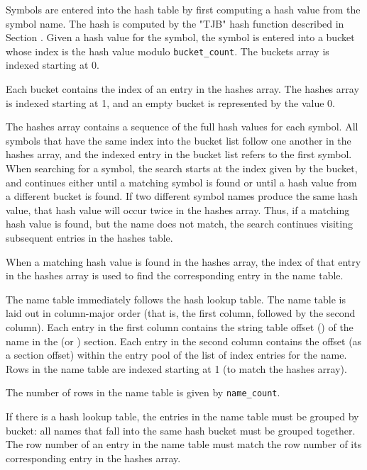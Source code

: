 Symbols are entered into the hash table by first computing a hash
value from the symbol name. The hash is computed by the "TJB" hash function
described in Section .
Given a hash value for the symbol,
the symbol is entered into a bucket whose index is the hash value
modulo \texttt{bucket\_count}. The buckets array is indexed starting at 0.

Each bucket contains the index of an entry in the hashes array. The
hashes array is indexed starting at 1, and an empty bucket is
represented by the value 0.

The hashes array contains a 
\bb
sequence
\eb
of the full hash values for each
symbol. All symbols that have the same index into the bucket list 
follow one another in the hashes array, and the indexed entry in 
the bucket list refers to the first symbol. 
When searching for a symbol, the search 
starts at the index given by the bucket, and continues either until a
matching symbol is found or until a hash value from a different bucket
is found. If two different symbol names produce the same hash value,
that hash value will occur twice in the hashes array. Thus, if a
matching hash value is found, but the name does not match, the search
continues visiting subsequent entries in the hashes table.

When a matching hash value is found in the hashes array, the index of
that entry in the hashes array is used to find the corresponding entry
in the name table.

The name table immediately follows the hash lookup table. The name
table is laid out in column-major order (that is, the first column,
followed by the second column). Each entry in the first column
contains the string table offset (\DWFORMstrp) of the name in the
\dotdebugstr{} (or \dotdebugstrdwo) section. Each entry in the second
column contains the offset (as a section offset) within the entry pool
of the list of index entries for the name. Rows in the name table are
indexed starting at 1 (to match the hashes array).

The number of rows in the name table is given by \texttt{name\_count}.

If there is a hash lookup table, the entries in the name table must be
grouped by bucket: all names that fall into the same hash bucket must
be grouped together. The row number of an entry in the name table must
match the row number of its corresponding entry in the hashes array.

